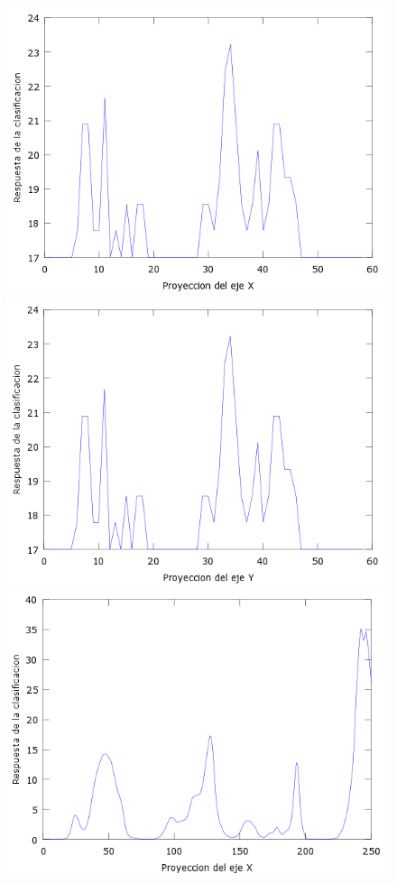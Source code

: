 \begin{figure}[htc]
  \centering
  \includegraphics[scale=.4]{images/plots/boost4X}
  \includegraphics[scale=.4]{images/plots/boost4Y}
  \includegraphics[scale=.4]{images/plots/svm4X}

\end{figure}
